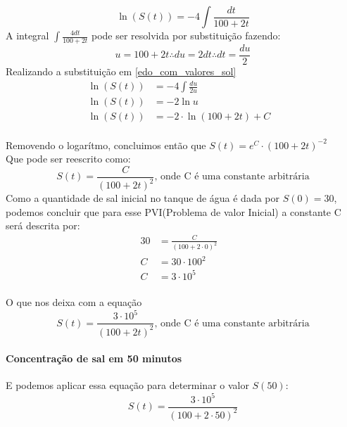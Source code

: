 \documentclass[11pt]{article}
\begin{document}
\begin{equation}
    \label{edo_com_valores_sol}
    \ln(S(t)) = - 4\int{\frac{dt}{100+2t}}
\end{equation} A integral \(\int{\frac{4dt}{100+2t}}\) pode ser
resolvida por substituição fazendo: \begin{equation*}
    u = 100 + 2t \therefore du = 2dt \therefore dt = \frac{du}{2}
\end{equation*} Realizando a substituição em \eqref{edo_com_valores_sol}
\begin{align*}
    \ln(S(t)) &= - 4\int{\frac{du}{2u}} & \\
    \ln(S(t)) &= - 2\ln{u} &\\
    \ln(S(t)) &= - 2 \cdot \ln(100 + 2t) + C 
\end{align*}\\
Removendo o logarítmo, concluimos então que
\(S(t) = e^{C}\cdot(100 + 2t)^{-2}\)\\
Que pode ser reescrito como: \begin{equation}
    \label{edo_com_valores_sol_1}
    S(t) = \frac{C}{(100 + 2t)^{2}} \text{, onde C é uma constante arbitrária}
\end{equation} Como a quantidade de sal inicial no tanque de água é dada
por \(S(0) = 30\), podemos concluir que para esse PVI(Problema de valor
Inicial) a constante C será descrita por: \begin{align*}
    30 &= \frac{C}{(100 + 2 \cdot 0)^{2}}  & \\
    C &= 30 \cdot 100^{2} & \\ 
    C &= 3 \cdot 10^{5}
\end{align*}\\
O que nos deixa com a equação \begin{equation}
    \label{edo_com_valores_sol_2}
    S(t) = \frac{3 \cdot 10^{5}}{(100 + 2t)^{2}} \text{, onde C é uma constante arbitrária}
\end{equation}

\hypertarget{concentrauxe7uxe3o-de-sal-em-50-minutos}{%
\paragraph{Concentração de sal em 50
minutos}\label{concentrauxe7uxe3o-de-sal-em-50-minutos}}

E podemos aplicar essa equação para determinar o valor \(S(50)\):
\begin{equation*}
    \label{edo_com_valores_sol_3}
    S(t) = \frac{3 \cdot 10^{5}}{(100 + 2 \cdot 50)^{2}}
\end{equation*}
\end{document}
